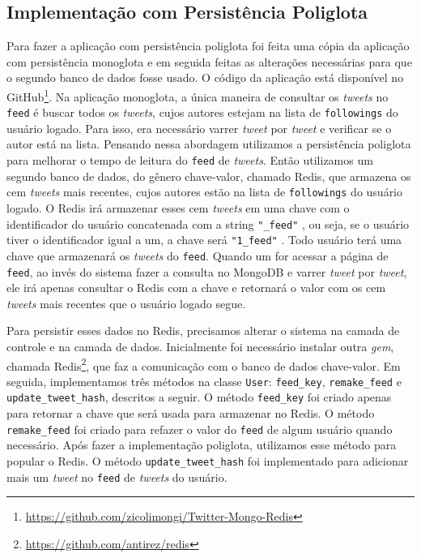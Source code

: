 \subsection{Implementação com Persistência Poliglota}
\label{subsec:polyglot}

Para fazer a aplicação com persistência poliglota foi feita uma cópia da aplicação com persistência monoglota e em seguida feitas as alterações necessárias para que o segundo banco de dados fosse usado. O código da aplicação está disponível no GitHub\footnote{\url{https://github.com/zicolimongi/Twitter-Mongo-Redis}}.
Na aplicação monoglota, a única maneira de consultar os \textit{tweets} no \verb|feed| é buscar todos os \textit{tweets}, cujos autores estejam na lista de \verb|followings| do usuário logado. Para isso, era necessário varrer \textit{tweet} por \textit{tweet} e verificar se o autor está na lista. Pensando nessa abordagem utilizamos a persistência poliglota para melhorar o tempo de leitura do \verb|feed| de \textit{tweets}.
Então utilizamos um segundo banco de dados, do gênero chave-valor, chamado \ac{Redis}, que armazena os cem \textit{tweets} mais recentes, cujos autores estão na lista de \verb|followings| do usuário logado.
O \ac{Redis} irá armazenar esses cem \textit{tweets} em uma chave com o identificador do usuário concatenada com a string \verb|"_feed"| , ou seja, se o usuário tiver o identificador igual a um, a chave será \verb|"1_feed"| . Todo usuário terá uma chave que armazenará os \textit{tweets} do \verb|feed|. Quando um for acessar a página de \verb|feed|, ao invés do sistema fazer a consulta no MongoDB e varrer \textit{tweet} por \textit{tweet}, ele irá apenas consultar o \ac{Redis} com a chave e retornará o valor com os cem \textit{tweets} mais recentes que o usuário logado segue.


Para persistir esses dados no \ac{Redis}, precisamos alterar o sistema na camada de controle e na camada de dados. Inicialmente foi necessário instalar outra \textit{gem}, chamada \ac{Redis}\footnote{\url{https://github.com/antirez/redis}}, que faz a comunicação com o banco de dados chave-valor. Em seguida, implementamos três métodos na classe \verb|User|: \verb|feed_key|, \verb|remake_feed| e \verb|update_tweet_hash|, descritos a seguir. O método \verb|feed_key| foi criado apenas para retornar a chave que será usada para armazenar no \ac{Redis}. O método \verb|remake_feed| foi criado para refazer o valor do \verb|feed| de algum usuário quando necessário. Após fazer a implementação poliglota, utilizamos esse método para popular o \ac{Redis}. O método \verb|update_tweet_hash| foi implementado para adicionar mais um \textit{tweet} no \verb|feed| de \textit{tweets} do usuário.

